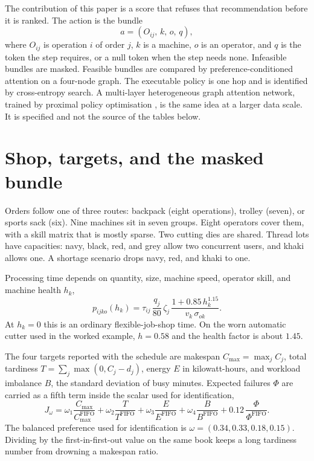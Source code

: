 \documentclass[10pt,a4paper]{article}
\newcommand{\cmax}{C_{\max}}
\begin{document}
The contribution of this paper is a score that refuses that recommendation before it is ranked. The action is the bundle
\begin{equation}
a = (O_{ij},\, k,\, o,\, q),
\label{eq:bundle}
\end{equation}
where \(O_{ij}\) is operation \(i\) of order \(j\), \(k\) is a machine, \(o\) is an operator, and \(q\) is the token the step requires, or a null token when the step needs none. Infeasible bundles are masked. Feasible bundles are compared by preference-conditioned attention on a four-node graph. The executable policy is one hop and is identified by cross-entropy search. A multi-layer heterogeneous graph attention network, trained by proximal policy optimisation \cite{velickovic2018,schulman2017}, is the same idea at a larger data scale. It is specified and not the source of the tables below.

\section{Shop, targets, and the masked bundle}

Orders follow one of three routes: backpack (eight operations), trolley (seven), or sports sack (six). Nine machines sit in seven groups. Eight operators cover them, with a skill matrix that is mostly sparse. Two cutting dies are shared. Thread lots have capacities: navy, black, red, and grey allow two concurrent users, and khaki allows one. A shortage scenario drops navy, red, and khaki to one.

Processing time depends on quantity, size, machine speed, operator skill, and machine health \(h_k\),
\begin{equation}
p_{ijko}(h_k) = \tau_{ij}\,\frac{q_j}{80}\,\zeta_j\,\frac{1 + 0.85\, h_k^{1.15}}{v_k\,\sigma_{ok}} .
\label{eq:ptime}
\end{equation}
At \(h_k = 0\) this is an ordinary flexible-job-shop time. On the worn automatic cutter used in the worked example, \(h = 0.58\) and the health factor is about \(1.45\).

The four targets reported with the schedule are makespan \(\cmax = \max_j C_j\), total tardiness \(T = \sum_j \max(0, C_j - d_j)\), energy \(E\) in kilowatt-hours, and workload imbalance \(B\), the standard deviation of busy minutes. Expected failures \(\Phi\) are carried as a fifth term inside the scalar used for identification,
\begin{equation}
J_\omega = \omega_1 \frac{\cmax}{\cmax^{\mathrm{FIFO}}} + \omega_2 \frac{T}{T^{\mathrm{FIFO}}} + \omega_3 \frac{E}{E^{\mathrm{FIFO}}} + \omega_4 \frac{B}{B^{\mathrm{FIFO}}} + 0.12\,\frac{\Phi}{\Phi^{\mathrm{FIFO}}} .
\label{eq:scalar}
\end{equation}
The balanced preference used for identification is \(\omega = (0.34, 0.33, 0.18, 0.15)\). Dividing by the first-in-first-out value on the same book keeps a long tardiness number from drowning a makespan ratio.
\end{document}
